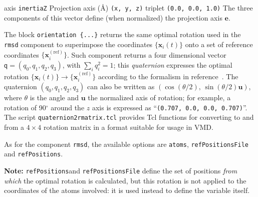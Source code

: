 \begin{cvcoptions}
\item %
\item %
  \keydef
    {axis}{%
    \texttt{inertiaZ}}{%
    Projection axis (\AA{})}{%
    \texttt{(x, y, z)} triplet}{%
    \texttt{(0.0, 0.0, 1.0)}}{%
    The three components of this vector define (when normalized) the
    projection axis $\mathbf{e}$.}
\end{cvcoptions}





The block \texttt{orientation~\{...\}} returns the
same optimal rotation used in the \texttt{rmsd} component to
superimpose the coordinates $\{\mathbf{x}_{i}(t)\}$ onto a set of
reference coordinates $\{\mathbf{x}_{i}^{\mathrm{(ref)}}\}$.  Such
component returns a four dimensional vector $\mathsf{q} = (q_0, q_1,
q_2, q_3)$, with $\sum_{i} q_{i}^{2} = 1$; this \emph{quaternion}
expresses the optimal rotation $\{\mathbf{x}_{i}(t)\} \rightarrow
\{\mathbf{x}_{i}^{\mathrm{(ref)}}\}$ according to the formalism in
reference~\cite{Coutsias2004}.  The quaternion $(q_0, q_1, q_2, q_3)$
can also be written as $\left(\cos(\theta/2), \,
  \sin(\theta/2)\mathbf{u}\right)$, where $\theta$ is the angle and
$\mathbf{u}$ the normalized axis of rotation; for example, a rotation
of 90$^{\circ}$ around the $z$ axis is expressed as
``\texttt{(0.707, 0.0, 0.0, 0.707)}''.  The script
\texttt{quaternion2rmatrix.tcl} provides Tcl functions for converting
to and from a $4\times{}4$ rotation matrix in a format suitable for
usage in VMD.

As for the component \texttt{rmsd}, the available options are \texttt{atoms}, \texttt{refPositionsFile} and \texttt{refPositions}.

\textbf{Note:} \texttt{refPositions}and \texttt{refPositionsFile} define the set of positions \emph{from which} the optimal rotation is calculated, but this rotation is not applied to the coordinates of the atoms involved: it is used instead to define the variable itself.

